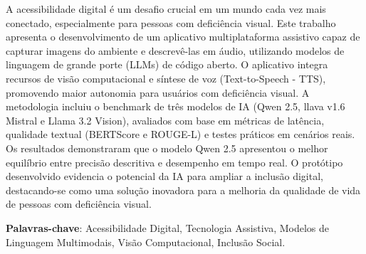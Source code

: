 \begin{resumo}


	
A acessibilidade digital é um desafio crucial em um mundo cada vez mais conectado, especialmente para pessoas com deficiência visual. Este trabalho apresenta o desenvolvimento de um aplicativo multiplataforma assistivo capaz de capturar imagens do ambiente e descrevê-las em áudio, utilizando modelos de linguagem de grande porte (LLMs) de código aberto. O aplicativo integra recursos de visão computacional e síntese de voz (Text-to-Speech - TTS), promovendo maior autonomia para usuários com deficiência visual. A metodologia incluiu o benchmark de três modelos de IA (Qwen 2.5, llava v1.6 Mistral e Llama 3.2 Vision), avaliados com base em métricas de latência, qualidade textual (BERTScore e ROUGE-L) e testes práticos em cenários reais. Os resultados demonstraram que o modelo Qwen 2.5 apresentou o melhor equilíbrio entre precisão descritiva e desempenho em tempo real. O protótipo desenvolvido evidencia o potencial da IA para ampliar a inclusão digital, destacando-se como uma solução inovadora para a melhoria da qualidade de vida de pessoas com deficiência visual.

	\vspace{\onelineskip}
	
	\textbf{Palavras-chave}: Acessibilidade Digital, Tecnologia Assistiva, Modelos de Linguagem Multimodais, Visão Computacional, Inclusão Social.
	
\end{resumo}